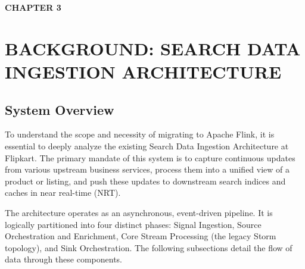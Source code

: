 \newpage
\textbf{\huge CHAPTER  3}\\
\section{BACKGROUND: SEARCH DATA INGESTION ARCHITECTURE} \setcounter{section}{3}
\subsection{System Overview}\setcounter{subsection}{1}
 
\begin{justify}
    To understand the scope and necessity of migrating to Apache Flink, it is essential to deeply analyze the existing Search Data Ingestion Architecture at Flipkart. The primary mandate of this system is to capture continuous updates from various upstream business services, process them into a unified view of a product or listing, and push these updates to downstream search indices and caches in near real-time (NRT). 

    The architecture operates as an asynchronous, event-driven pipeline. It is logically partitioned into four distinct phases: Signal Ingestion, Source Orchestration and Enrichment, Core Stream Processing (the legacy Storm topology), and Sink Orchestration. The following subsections detail the flow of data through these components.
\end{justify}

\vspace{0.25cm}

